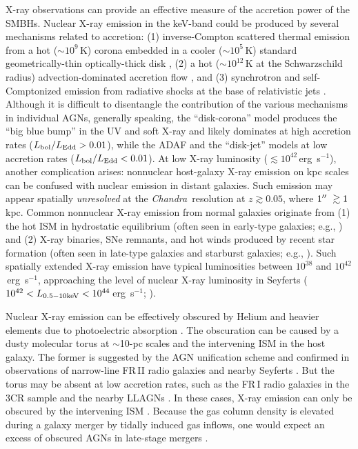 \documentclass[iop,revtex4,twocolumn,apj,numberedappendix,appendixfloats]{emulateapj}
\newcommand{\ergs}{erg~s$^{-1}$}
\newcommand{\chandra}{{\it Chandra}}
\begin{document}
X-ray observations can provide an effective measure of the accretion power of the SMBHs. Nuclear X-ray emission in the keV-band could be produced by several mechanisms related to accretion: (1) inverse-Compton scattered thermal emission from a hot ($\sim10^9$\,K) corona \citep{Liang77,Haardt93} embedded in a cooler ($\sim10^5$\,K) standard geometrically-thin optically-thick disk \citep{Shakura73}, (2) a hot ($\sim10^{12}$\,K at the Schwarzschild radius) advection-dominated accretion flow \citep[ADAF; see][for a review]{Yuan14}, and (3) synchrotron and self-Comptonized emission from radiative shocks at the base of relativistic jets \citep{Yuan02}. Although it is difficult to disentangle the contribution of the various mechanisms in individual AGNs, generally speaking, the ``disk-corona'' model produces the ``big blue bump'' in the UV and soft X-ray and likely dominates at high accretion rates ($L_{\rm bol}/L_{\rm Edd} > 0.01$), while the ADAF and the ``disk-jet'' models at low accretion rates ($L_{\rm bol}/L_{\rm Edd} < 0.01$). 
%
At low X-ray luminosity ($\lesssim 10^{42}$\,\ergs), another complication arises: nonnuclear host-galaxy X-ray emission on kpc scales can be confused with nuclear emission in distant galaxies. Such emission may appear spatially {\it unresolved} at the \chandra\ resolution at $z \gtrsim 0.05$, where $1\mbox{$^{\prime\prime}$}\ \gtrsim 1$\,kpc. Common nonnuclear X-ray emission from normal galaxies originate from (1) the hot ISM in hydrostatic equilibrium (often seen in early-type galaxies; e.g., \citealt{Forman85}) and (2) X-ray binaries, SNe remnants, and hot winds produced by recent star formation (often seen in late-type galaxies and starburst galaxies; e.g., \citealt{Fabbiano89}). Such spatially extended X-ray emission have typical luminosities between $10^{38}$ and $10^{42}$\,\ergs, approaching the level of nuclear X-ray luminosity in Seyferts ($10^{42} < L_{\rm 0.5-10 keV} < 10^{44}$\,\ergs; \citealt{Brusa07}). 

Nuclear X-ray emission can be effectively obscured by Helium and heavier elements due to photoelectric absorption \citep{Morrison83}. The obscuration can be caused by a dusty molecular torus at $\sim$10-pc scales and the intervening ISM in the host galaxy. The former is suggested by the AGN unification scheme \citep{Urry95} and confirmed in observations of narrow-line FR\,II radio galaxies \citep[e.g.,][]{Sambruna99} and nearby Seyferts \citep[e.g.,][]{Garcia-Burillo16,Gallimore16,Alonso-Herrero18,Fabbiano18}. But the torus may be absent at low accretion rates, such as the FR\,I radio galaxies in the 3CR sample \citep[e.g.,][]{Donato04,Balmaverde06,Evans06a} and the nearby LLAGNs \citep[e.g.,][]{Ho08}. In these cases, X-ray emission can only be obscured by the intervening ISM \citep[e.g.,][]{Gilli14}. Because the gas column density is elevated during a galaxy merger by tidally induced gas inflows, one would expect an excess of obscured AGNs in late-stage mergers \citep[e.g.,][]{Hopkins05a}.
\end{document}
